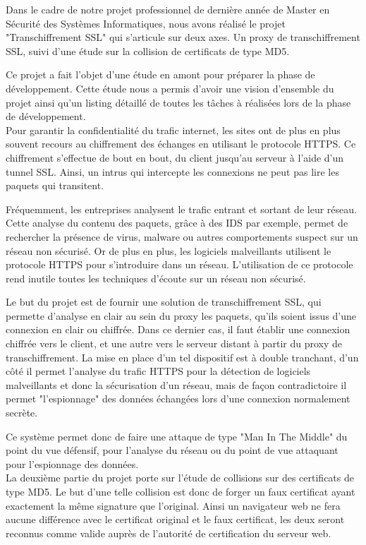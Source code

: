 Dans le cadre de notre projet professionnel de dernière année de Master en Sécurité des Systèmes 
Informatiques, nous avons réalisé le projet "Transchiffrement SSL" qui s'articule sur deux axes. Un proxy de transchiffrement SSL, suivi d'une 
étude sur la collision de certificats de type MD5.

Ce projet a fait l'objet d'une étude en amont pour préparer la phase de 
développement. Cette étude nous a permis d'avoir une vision d'ensemble du projet 
ainsi qu'un listing détaillé de toutes les tâches à réalisées lors de la phase 
de développement.~~\\

Pour garantir la confidentialité du trafic internet, les sites ont de plus en plus souvent recours au chiffrement des échanges en utilisant le protocole HTTPS.
Ce chiffrement s'effectue de bout en bout, du client jusqu'au serveur à l'aide d'un tunnel SSL.
Ainsi, un intrus qui intercepte les connexions ne peut pas lire les paquets qui transitent.


Fréquemment, les entreprises analysent le trafic entrant et sortant de leur réseau.
Cette analyse du contenu des paquets, grâce à des IDS par exemple, permet de rechercher la présence de virus,
malware ou autres comportements suspect sur un réseau non sécurisé. Or de plus en plus, les 
logiciels malveillants utilisent le protocole HTTPS pour s'introduire dans un 
réseau. L'utilisation de ce protocole rend inutile toutes les techniques 
d'écoute sur un réseau non sécurisé.


Le but du projet est de fournir une solution de transchiffrement SSL, qui permette d'analyse en clair au sein du proxy les paquets,
qu'ils soient issus d'une connexion en clair ou chiffrée. Dans ce dernier cas, il faut établir une connexion chiffrée vers le client,
et une autre vers le serveur distant à partir du proxy de transchiffrement.
La mise en place d'un tel dispositif est à double tranchant, d'un côté il permet 
l'analyse du trafic HTTPS pour la détection de logiciels malveillants et donc la 
sécurisation d'un réseau, mais de façon contradictoire il permet "l'espionnage" 
des données échangées lors d'une connexion normalement secrète.

Ce système permet donc de faire une attaque de type "Man In The Middle" du point 
du vue défensif, pour l'analyse du réseau ou du point de vue attaquant pour 
l'espionnage des données.
~~\\

La deuxième partie du projet porte sur l'étude de collisions sur des certificats
de type MD5. Le but d'une telle collision est donc de forger un faux certificat 
ayant exactement la même signature que l'original. Ainsi un navigateur web ne 
fera aucune différence avec le certificat original et le faux certificat, les 
deux seront reconnus comme valide auprès de l'autorité de certification du serveur 
web.

